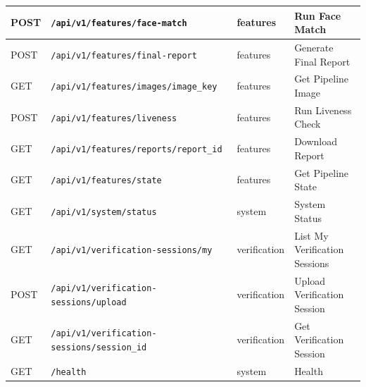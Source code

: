\begin{longtable}{p{1.2cm}p{6.0cm}p{3.2cm}p{4.0cm}}
\hline
POST & \texttt{/api/v1/features/face-match} & features & Run Face Match \\
\hline
POST & \texttt{/api/v1/features/final-report} & features & Generate Final Report \\
\hline
GET & \texttt{/api/v1/features/images/{image\_key}} & features & Get Pipeline Image \\
\hline
POST & \texttt{/api/v1/features/liveness} & features & Run Liveness Check \\
\hline
GET & \texttt{/api/v1/features/reports/{report\_id}} & features & Download Report \\
\hline
GET & \texttt{/api/v1/features/state} & features & Get Pipeline State \\
\hline
GET & \texttt{/api/v1/system/status} & system & System Status \\
\hline
GET & \texttt{/api/v1/verification-sessions/my} & verification & List My Verification Sessions \\
\hline
POST & \texttt{/api/v1/verification-sessions/upload} & verification & Upload Verification Session \\
\hline
GET & \texttt{/api/v1/verification-sessions/{session\_id}} & verification & Get Verification Session \\
\hline
GET & \texttt{/health} & system & Health \\
\hline
\end{longtable}
